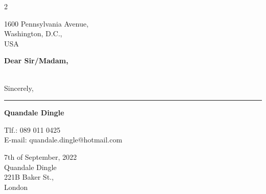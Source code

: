 \documentclass[11pt]{article}
\newcommand\signature[2]{%
\noindent\begin{minipage}{10cm}
    \noindent\vspace{1cm}\par
    \noindent\rule{5cm}{1pt}\par
    \noindent\textbf{#1}\par
    \noindent\vspace{1pt}\par
    \noindent#2%
\end{minipage}}
\begin{document}
\setlength{\columnsep}{0.3in}
\setcolumnwidth{3.1in, 1.07in}

\begin{paracol}{2}
    \begin{tcolorbox}[blanker, breakable, width=\linewidth]
    
    1600 Pennsylvania Avenue, \\
    Washington, D.C., \\
    USA
    
    \noindent\vspace{4cm}\par
    
    \textbf{Dear Sir/Madam,} \\
    
    \lipsum[1][1-4] \\
    
    \lipsum[2][1-5]
    
    \noindent\vspace{1cm}\par
    
    Sincerely, \\
    \signature{Quandale Dingle}{Tlf.: 089 011 0425 \\ E-mail: quandale.dingle@hotmail.com}
        
    \end{tcolorbox}
    \switchcolumn
    \begin{tcolorbox}[blanker, breakable, width=\linewidth]
    {
    7th of September, 2022 \\
    
    Quandale Dingle \\
    
    221B Baker St., \\
    London
    }
    \end{tcolorbox}
\end{paracol}

\fancyhf{}
\renewcommand{\headrulewidth}{0pt}
\end{document}
